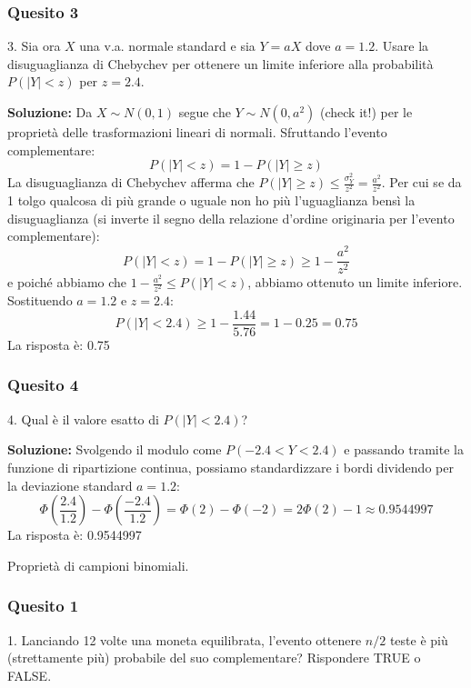 \documentclass[12pt, a4paper]{article}
\begin{document}
\subsubsection*{Quesito 3}
3. Sia ora $X$ una v.a. normale standard e sia $Y=aX$ dove $a=1.2$. Usare la disuguaglianza di Chebychev per ottenere un limite inferiore alla probabilità $P(|Y|<z)$ per $z=2.4$.

\textbf{Soluzione:}
Da $X \sim N(0,1)$ segue che $Y \sim N(0, a^2)$ (check it!) per le proprietà delle trasformazioni lineari di normali.
Sfruttando l'evento complementare:
$$ P(|Y| < z) = 1 - P(|Y| \geq z) $$
La disuguaglianza di Chebychev afferma che $P(|Y| \geq z) \leq \frac{\sigma_Y^2}{z^2} = \frac{a^2}{z^2}$.
Per cui se da 1 tolgo qualcosa di più grande o uguale non ho più l’uguaglianza bensì la disuguaglianza (si inverte il segno della relazione d'ordine originaria per l'evento complementare):
$$ P(|Y| < z) = 1 - P(|Y| \geq z) \geq 1 - \frac{a^2}{z^2} $$
e poiché abbiamo che $1 - \frac{a^2}{z^2} \leq P(|Y| < z)$, abbiamo ottenuto un limite inferiore.
Sostituendo $a=1.2$ e $z=2.4$:
$$ P(|Y| < 2.4) \geq 1 - \frac{1.44}{5.76} = 1 - 0.25 = 0.75 $$
La risposta è: 0.75

\subsubsection*{Quesito 4}
4. Qual è il valore esatto di $P(|Y|<2.4)$?

\textbf{Soluzione:}
Svolgendo il modulo come $P(-2.4 < Y < 2.4)$ e passando tramite la funzione di ripartizione continua, possiamo standardizzare i bordi dividendo per la deviazione standard $a=1.2$:
$$ \Phi\left(\frac{2.4}{1.2}\right) - \Phi\left(\frac{-2.4}{1.2}\right) = \Phi(2) - \Phi(-2) = 2\Phi(2) - 1 \approx 0.9544997 $$
La risposta è: 0.9544997


\vspace{0.5cm}
\begin{tcolorbox}[colback=lightergray!10, colframe=tocsec, title=\textbf{Esercizio 6}]
Proprietà di campioni binomiali.
\end{tcolorbox}

\subsubsection*{Quesito 1}
1. Lanciando 12 volte una moneta equilibrata, l’evento ottenere $n/2$ teste è più (strettamente più) probabile del suo complementare? Rispondere TRUE o FALSE.
\end{document}
